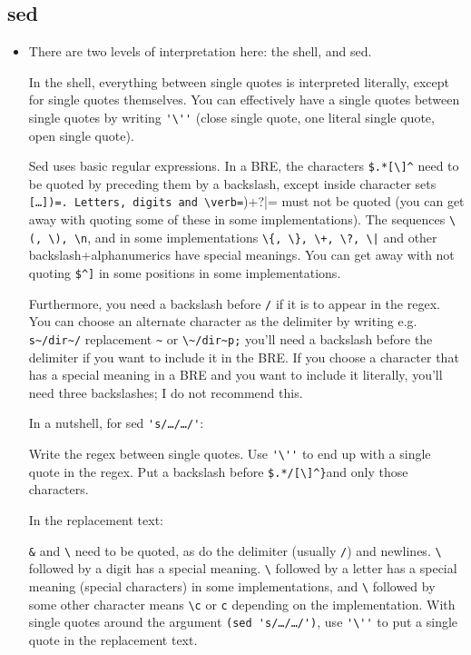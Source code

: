 \subsection{sed}

\begin{itemize}

\item There are two levels of interpretation here: the shell, and sed.

In the shell, everything between single quotes is interpreted literally, except for single quotes themselves. You can effectively have a single quotes between single quotes by writing \lstinline[columns=fixed]{'\''} (close single quote, one literal single quote, open single quote).

Sed uses basic regular expressions. In a BRE, the characters \verb=$.*[\]^= need to be quoted by preceding them by a backslash, except inside character sets \verb([…])=. Letters, digits and \verb=(){}+?|= must not be quoted (you can get away with quoting some of these in some implementations). The sequences \verb=\(, \), \n=, and in some implementations \verb=\{, \}, \+, \?, \|= and other backslash+alphanumerics have special meanings. You can get away with not quoting \verb=$^]= in some positions in some implementations.

Furthermore, you need a backslash before \verb=/= if it is to appear in the regex. You can choose an alternate character as the delimiter by writing e.g. \verb=s~/dir~/= replacement \verb=~= or \verb=\~/dir~p;= you'll need a backslash before the delimiter if you want to include it in the BRE. If you choose a character that has a special meaning in a BRE and you want to include it literally, you'll need three backslashes; I do not recommend this.

In a nutshell, for sed \verb='s/…/…/'=:

    Write the regex between single quotes.
    Use \verb='\''= to end up with a single quote in the regex.
    Put a backslash before \verb=$.*/[\]^}=and only those characters.

In the replacement text:

  \lstinline[columns=fixed]{&} and \lstinline[columns=fixed]{\} need to be quoted, as do the delimiter (usually \lstinline[columns=fixed]{/}) and newlines.
    \lstinline[columns=fixed]{\} followed by a digit has a special meaning. \lstinline[columns=fixed]{\} followed by a letter has a special meaning (special characters) in some implementations, and \lstinline[columns=fixed]{\} followed by some other character means \lstinline[columns=fixed]{\c} or \lstinline[columns=fixed]{c} depending on the implementation.
    With single quotes around the argument \verb=(sed 's/…/…/')=, use \verb='\''= to put a single quote in the replacement text.


\end{itemize}
